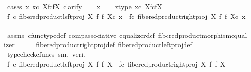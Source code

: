 \begin{isabellebody}
\ {\isacharparenleft}{\kern0pt}cases\ {\isachardoublequoteopen}{\isasymexists}x{\isachardot}{\kern0pt}\ x{\isasymin}\isactrlsub c\ X\isactrlbsub f\isactrlesub {\isasymtimes}\isactrlsub c\isactrlbsub f\isactrlesub X{\isachardoublequoteclose}{\isacharcomma}{\kern0pt}\ clarify{\isacharparenright}{\kern0pt}\isanewline
\ \ \isamarkupfalse%
\ x\isanewline
\ \ \isamarkupfalse%
\ x{\isacharunderscore}{\kern0pt}type{\isacharcolon}{\kern0pt}\ {\isachardoublequoteopen}x{\isasymin}\isactrlsub c\ X\isactrlbsub f\isactrlesub {\isasymtimes}\isactrlsub c\isactrlbsub f\isactrlesub X{\isachardoublequoteclose}\isanewline
\ \ \isamarkupfalse%
\ \isamarkupfalse%
\ {\isachardoublequoteopen}{\isacharparenleft}{\kern0pt}f\ {\isasymcirc}\isactrlsub c\ {\isacharparenleft}{\kern0pt}fibered{\isacharunderscore}{\kern0pt}product{\isacharunderscore}{\kern0pt}left{\isacharunderscore}{\kern0pt}proj\ X\ f\ f\ X{\isacharparenright}{\kern0pt}{\isacharparenright}{\kern0pt}{\isasymcirc}\isactrlsub c\ x\ {\isacharequal}{\kern0pt}\ {\isacharparenleft}{\kern0pt}f{\isasymcirc}\isactrlsub c\ {\isacharparenleft}{\kern0pt}fibered{\isacharunderscore}{\kern0pt}product{\isacharunderscore}{\kern0pt}right{\isacharunderscore}{\kern0pt}proj\ X\ f\ f\ X{\isacharparenright}{\kern0pt}{\isacharparenright}{\kern0pt}{\isasymcirc}\isactrlsub c\ x{\isachardoublequoteclose}\isanewline
\ \ \ \ \isamarkupfalse%
\ assms\ cfunc{\isacharunderscore}{\kern0pt}type{\isacharunderscore}{\kern0pt}def\ comp{\isacharunderscore}{\kern0pt}associative\ equalizer{\isacharunderscore}{\kern0pt}def\ fibered{\isacharunderscore}{\kern0pt}product{\isacharunderscore}{\kern0pt}morphism{\isacharunderscore}{\kern0pt}equalizer\isanewline
\ \ \ \ \isamarkupfalse%
\ fibered{\isacharunderscore}{\kern0pt}product{\isacharunderscore}{\kern0pt}right{\isacharunderscore}{\kern0pt}proj{\isacharunderscore}{\kern0pt}def\ fibered{\isacharunderscore}{\kern0pt}product{\isacharunderscore}{\kern0pt}left{\isacharunderscore}{\kern0pt}proj{\isacharunderscore}{\kern0pt}def\isanewline
\ \ \ \ \isamarkupfalse%
\ {\isacharparenleft}{\kern0pt}typecheck{\isacharunderscore}{\kern0pt}cfuncs{\isacharcomma}{\kern0pt}\ smt\ {\isacharparenleft}{\kern0pt}verit{\isacharparenright}{\kern0pt}{\isacharparenright}{\kern0pt}\isanewline
\ \ \isamarkupfalse%
\ \isamarkupfalse%
\ {\isachardoublequoteopen}f\ {\isasymcirc}\isactrlsub c\ {\isacharparenleft}{\kern0pt}fibered{\isacharunderscore}{\kern0pt}product{\isacharunderscore}{\kern0pt}left{\isacharunderscore}{\kern0pt}proj\ X\ f\ f\ X{\isacharparenright}{\kern0pt}\ {\isacharequal}{\kern0pt}\ f{\isasymcirc}\isactrlsub c\ {\isacharparenleft}{\kern0pt}fibered{\isacharunderscore}{\kern0pt}product{\isacharunderscore}{\kern0pt}right{\isacharunderscore}{\kern0pt}proj\ X\ f\ f\ X{\isacharparenright}{\kern0pt}{\isachardoublequoteclose}\isanewline

\end{isabellebody}
